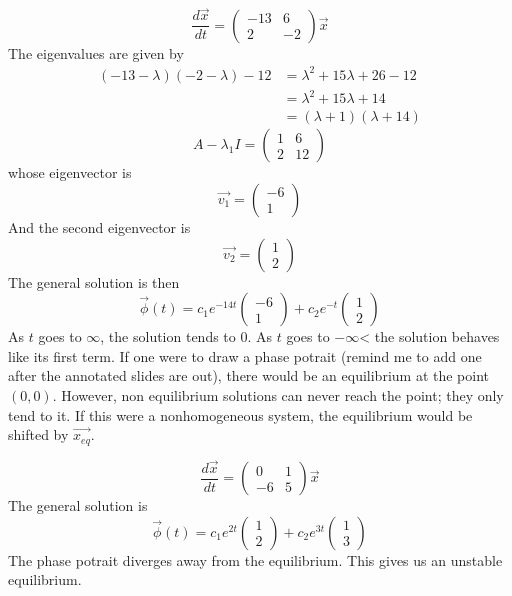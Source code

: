 \documentclass[12pt]{article}
\begin{document}
\begin{ex}
	$$\frac{d\vec{x}}{dt} = \begin{pmatrix} -13 & 6 \\ 2 & -2 \end{pmatrix} \vec{x}$$
	The eigenvalues are given by
	\begin{align*}
		(-13-\lambda)(-2-\lambda) - 12 &= \lambda^2 + 15 \lambda + 26 - 12 \\
					       &= \lambda^2 + 15\lambda + 14 \\
					       &= (\lambda+1)(\lambda+14)
	\end{align*}
	$$A-\lambda_1I = \begin{pmatrix} 1 & 6 \\ 2 & 12 \end{pmatrix}$$
	whose eigenvector is $$\vec{v_1} = \begin{pmatrix} -6 \\ 1 \end{pmatrix}$$
	And the second eigenvector is $$\vec{v_2} = \begin{pmatrix} 1 \\ 2 \end{pmatrix}$$
	The general solution is then
	$$\vec{\phi}(t) = c_1e^{-14t} \begin{pmatrix} -6 \\ 1\end{pmatrix} + c_2 e^{-t} \begin{pmatrix} 1 \\ 2 \end{pmatrix}$$
	As $t$ goes to $\infty$, the solution tends to 0. As $t$ goes to $-\infty$< the solution behaves like its first term.
	If one were to draw a phase potrait (remind me to add one after the annotated slides are out), there would be an equilibrium at the point $(0,0)$. However, non equilibrium solutions can never reach the point; they only tend to it. If this were a nonhomogeneous system, the equilibrium would be shifted by $\vec{x_{eq}}$.
\end{ex}

\begin{ex}
	$$\frac{d\vec{x}}{dt} = \begin{pmatrix} 0 & 1 \\ -6 & 5 \end{pmatrix}\vec{x}$$
	The general solution is
	$$\vec{\phi}(t) = c_1e^{2t} \begin{pmatrix} 1 \\ 2\end{pmatrix} + c_2e^{3t} \begin{pmatrix} 1 \\ 3\end{pmatrix}$$
	The phase potrait diverges away from the equilibrium. This gives us an unstable equilibrium.
\end{ex}
\end{document}
